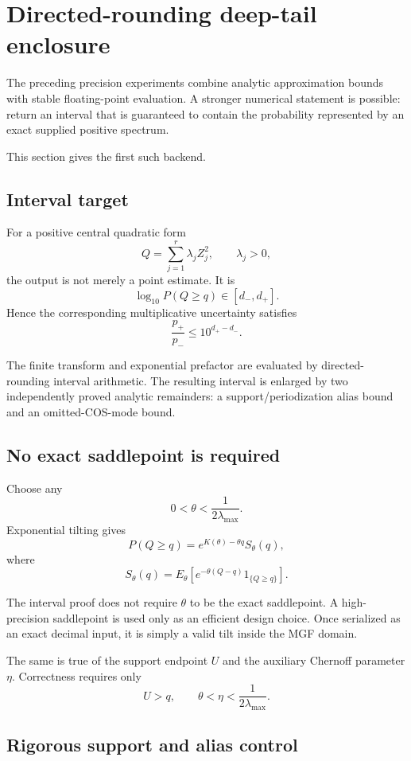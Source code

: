 \documentclass[11pt]{article}
\theoremstyle{definition}
\theoremstyle{remark}
\begin{document}
\section{Directed-rounding deep-tail enclosure}

The preceding precision experiments combine analytic approximation bounds with
stable floating-point evaluation.  A stronger numerical statement is possible:
return an interval that is guaranteed to contain the probability represented
by an exact supplied positive spectrum.

This section gives the first such backend.

\subsection{Interval target}

For a positive central quadratic form
\[
Q=\sum_{j=1}^{r}\lambda_jZ_j^2,
\qquad
\lambda_j>0,
\]
the output is not merely a point estimate.  It is
\[
\boxed{
\log_{10}P(Q\ge q)\in[d_-,d_+].
}
\]
Hence the corresponding multiplicative uncertainty satisfies
\[
\boxed{
\frac{p_+}{p_-}\le 10^{d_+-d_-}.
}
\]

The finite transform and exponential prefactor are evaluated by
directed-rounding interval arithmetic.  The resulting interval is enlarged by
two independently proved analytic remainders: a support/periodization alias
bound and an omitted-COS-mode bound.

\subsection{No exact saddlepoint is required}

Choose any
\[
0<\theta<\frac{1}{2\lambda_{\max}}.
\]
Exponential tilting gives
\[
P(Q\ge q)
=
e^{K(\theta)-\theta q}
S_\theta(q),
\]
where
\[
S_\theta(q)
=
E_\theta\!\left[
e^{-\theta(Q-q)}
1_{\{Q\ge q\}}
\right].
\]

The interval proof does not require \(\theta\) to be the exact saddlepoint.
A high-precision saddlepoint is used only as an efficient design choice.
Once serialized as an exact decimal input, it is simply a valid tilt inside
the MGF domain.

The same is true of the support endpoint \(U\) and the auxiliary Chernoff
parameter \(\eta\).  Correctness requires only
\[
U>q,
\qquad
\theta<\eta<\frac{1}{2\lambda_{\max}}.
\]

\subsection{Rigorous support and alias control}
\end{document}
